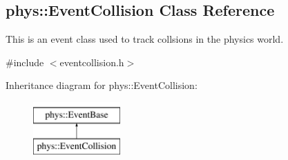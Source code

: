 \hypertarget{classphys_1_1EventCollision}{
\subsection{phys::EventCollision Class Reference}
\label{classphys_1_1EventCollision}
}


This is an event class used to track collsions in the physics world.  




{\ttfamily \#include $<$eventcollision.h$>$}

Inheritance diagram for phys::EventCollision:\begin{figure}[H]
\begin{center}
\leavevmode
\includegraphics[height=2.000000cm]{classphys_1_1EventCollision}
\end{center}
\end{figure}
